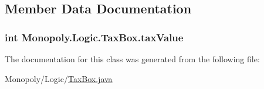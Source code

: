 \subsection{Member Data Documentation}
\subsubsection[{\texorpdfstring{tax\+Value}{taxValue}}]{\setlength{\rightskip}{0pt plus 5cm}int Monopoly.\+Logic.\+Tax\+Box.\+tax\+Value\hspace{0.3cm}{\ttfamily [private]}}\hypertarget{class_monopoly_1_1_logic_1_1_tax_box_a006558e6ac0b75b55480cc0fced64115}{}\label{class_monopoly_1_1_logic_1_1_tax_box_a006558e6ac0b75b55480cc0fced64115}


The documentation for this class was generated from the following file\+:\begin{DoxyCompactItemize}
\item 
Monopoly/\+Logic/\hyperlink{_tax_box_8java}{Tax\+Box.\+java}\end{DoxyCompactItemize}
